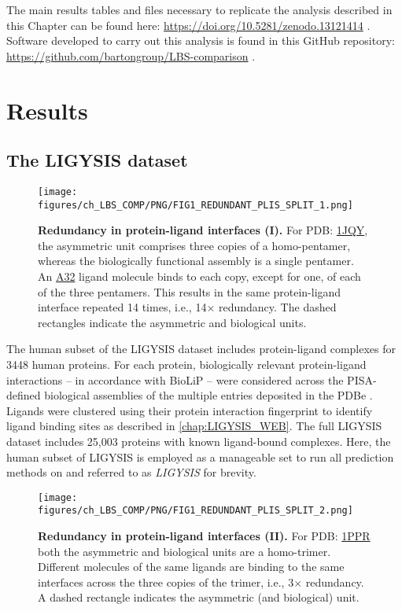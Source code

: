 The main results tables and files necessary to replicate the analysis described in this Chapter can be found here: \url{https://doi.org/10.5281/zenodo.13121414} \cite{UTGES_2024_LBSCOMP_ZENODO}. Software developed to carry out this analysis is found in this GitHub repository: \url{https://github.com/bartongroup/LBS-comparison} \cite{UTGES_2024_LBSCOMP_REPO}.

\section{Results}

\subsection{The LIGYSIS dataset}

\begin{figure}[htb!]
    \centering
    \texttt{[image: figures/ch\_LBS\_COMP/PNG/FIG1\_REDUNDANT\_PLIS\_SPLIT\_1.png]}
    \caption[Redundancy in protein-ligand interfaces (I)]{\textbf{Redundancy in protein-ligand interfaces (I).} For PDB: \href{https://www.ebi.ac.uk/pdbe/entry/pdb/1jqy}{1JQY}, the asymmetric unit comprises three copies of a homo-pentamer, whereas the biologically functional assembly is a single pentamer. An \href{https://www.ebi.ac.uk/pdbe-srv/pdbechem/chemicalCompound/show/A32}{A32} ligand molecule binds to each copy, except for one, of each of the three pentamers. This results in the same protein-ligand interface repeated 14 times, i.e., 14$\times$ redundancy. The dashed rectangles indicate the asymmetric and biological units.}
    \label{fig:redundant_plis_1}
\end{figure}

The human subset of the LIGYSIS dataset includes protein-ligand complexes for 3448 human proteins. For each protein, biologically relevant protein-ligand interactions -- in accordance with BioLiP \cite{YANG_2013_BIOLIP} -- were considered across the PISA-defined \cite{KRISSINEL_2007_PISA} biological assemblies of the multiple entries deposited in the PDBe \cite{ARMSTRONG_2020_PDBE}. Ligands were clustered using their protein interaction fingerprint to identify ligand binding sites as described in \autoref{chap:LIGYSIS_WEB}. The full LIGYSIS dataset includes 25,003 proteins with known ligand-bound complexes. Here, the human subset of LIGYSIS is employed as a manageable set to run all prediction methods on and referred to as \textit{LIGYSIS} for brevity.

\begin{figure}[htb!]
    \centering
    \texttt{[image: figures/ch\_LBS\_COMP/PNG/FIG1\_REDUNDANT\_PLIS\_SPLIT\_2.png]}
    \caption[Redundancy in protein-ligand interfaces (II)]{\textbf{Redundancy in protein-ligand interfaces (II).} For PDB: \href{https://www.ebi.ac.uk/pdbe/entry/pdb/1PPR}{1PPR} both the asymmetric and biological units are a homo-trimer. Different molecules of the same ligands are binding to the same interfaces across the three copies of the trimer, i.e., 3$\times$ redundancy. A dashed rectangle indicates the asymmetric (and biological) unit.}
    \label{fig:redundant_plis_2}
\end{figure}

